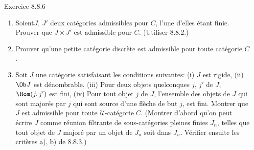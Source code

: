 \begin{enonce*}[remark]{Exercice 8.8.6}
\begin{enumerate}
\renewcommand{\theenumi}{\alph{enumi}}
\renewcommand{\labelenumi}{\theenumi)}
\item Soient\pageoriginale $J$, $J'$ deux catégories admissibles
pour $C$, l'une d'elles étant finie. Prouver que $J\times J'$ est
admissible pour $C$. (Utiliser 8.8.2.)

\item Prouver qu'une petite catégorie discrète est admissible pour
toute catégorie $C$.

\item Soit $J$ une catégorie satisfaisant les conditions suivantes:
(i) $J$ est rigide, (ii) $\Ob J$ est dénombrable, (iii) Pour deux
objets quelconques $j$, $j'$ de $J$, $\Hom(j,j')$ est fini, (iv)
Pour tout objet $j$ de $J$, l'ensemble des objets de $J$ qui sont
majorés par $j$ \ie qui sont source d'une flèche de but $j$, est
fini. Montrer que $J$ est admissible pour toute
$𝒰$-catégorie $C$. (Montrer d'abord qu'on peut écrire $J$
comme réunion filtrante de sous-catégories pleines finies $J_n$,
telles que tout objet de $J$ majoré par un objet de $J_n$ soit dans
$J_n$. Vérifier ensuite les critères a), b) de 8.8.3.)
\end{enumerate}
\end{enonce*}

